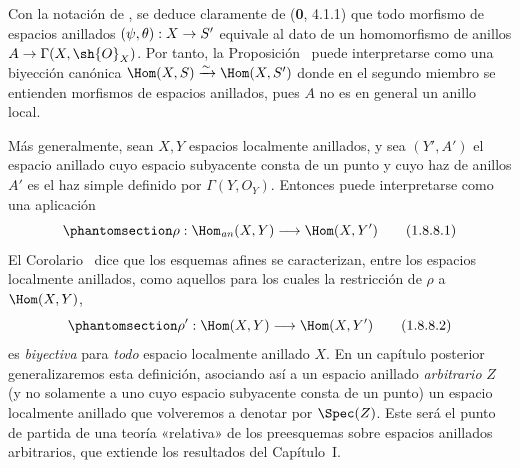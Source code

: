 \documentclass[oneside,10pt]{amsart}
\makeatletter
\newcommand{\ega@arrow}[2]{\mathchoice{#1}{#2}{#2}{#2}}
\renewcommand{\to}{\ega@arrow{\longrightarrow}{\rightarrow}}
\let\EGAOriginalLabel\label
\renewcommand{\label}[1]{\phantomsection\EGAOriginalLabel{#1}}
\makeatother
\begin{document}
\begin{env}[1.8.8]
\label{ega2:addendum:I.1.8.8-fr}
Con la notación de , se deduce claramente de
(\textbf 0, 4.1.1) que todo morfismo de espacios anillados
$(\psi,\theta):X\to S'$ equivale al dato de un homomorfismo de
anillos $A\to\Gamma(X,\sh{O}_X)$. Por tanto, la
Proposición~ puede interpretarse como una biyección
canónica
$\Hom(X,S)\xrightarrow{\sim}\Hom(X,S')$
donde en el segundo miembro se entienden morfismos de espacios
anillados, pues $A$ no es en general un anillo local.

Más generalmente, sean $X,Y$ espacios localmente anillados, y sea
$(Y',A')$ el espacio anillado cuyo espacio subyacente consta de un
punto y cuyo haz de anillos $A'$ es el haz simple definido por
$\Gamma(Y,O_Y)$. Entonces  puede interpretarse
como una aplicación
\begin{equation}
\label{ega2:addendum:I.1.8.8.1-fr}
  \rho:\Hom_{\mathit{an}}(X,Y)\to\Hom(X,Y')
\tag{1.8.8.1}
\end{equation}
El Corolario~ dice que los esquemas afines se
caracterizan, entre los espacios localmente anillados, como aquellos
para los cuales la restricción de $\rho$ a $\Hom(X,Y)$,
\begin{equation}
\label{ega2:addendum:I.1.8.8.2-fr}
  \rho':\Hom(X,Y)\to\Hom(X,Y')
\tag{1.8.8.2}
\end{equation}
es \emph{biyectiva} para \emph{todo} espacio localmente anillado $X$. En un capítulo
posterior generalizaremos esta definición, asociando así a un espacio
anillado \emph{arbitrario} $Z$ (y no solamente a uno cuyo espacio subyacente
consta de un punto) un espacio localmente anillado que volveremos a
denotar por $\Spec(Z)$. Este será el punto de partida de una teoría
«relativa» de los preesquemas sobre espacios anillados arbitrarios,
que extiende los resultados del Capítulo~I.
\end{env}
\end{document}
